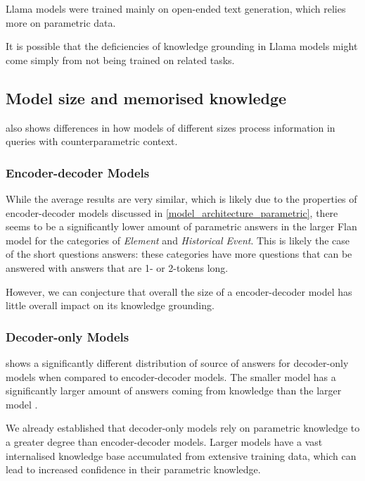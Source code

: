 Llama models were trained mainly on open-ended text generation, which relies more on parametric data.

It is possible that the deficiencies of knowledge grounding in Llama models might come simply from not being trained on related tasks.

\subsection{Model size and memorised knowledge}
\label{model_size_parametric}

 also shows differences in how models of different sizes process information in queries with counterparametric context.

\subsubsection{Encoder-decoder Models}

While the average results are very similar, which is likely due to the properties of encoder-decoder models discussed in \cref{model_architecture_parametric}, there seems to be a significantly lower amount of parametric answers in the larger Flan model for the categories of \emph{Element} and \emph{Historical Event}.
This is likely the case of the short questions answers: these categories have more questions that can be answered with answers that are 1- or 2-tokens long.

However, we can conjecture that overall the size of a encoder-decoder model has little overall impact on its knowledge grounding.

\subsubsection{Decoder-only Models}

 shows a significantly different distribution of source of answers for decoder-only models when compared to encoder-decoder models.
The smaller model \smallllama{} has a significantly larger amount of answers coming from \Contextual{} knowledge than the larger model \bigllama{}.

We already established that decoder-only models rely on parametric knowledge to a greater degree than encoder-decoder models.
Larger models have a vast internalised knowledge base accumulated from extensive training data, which can lead to increased confidence in their parametric knowledge.

